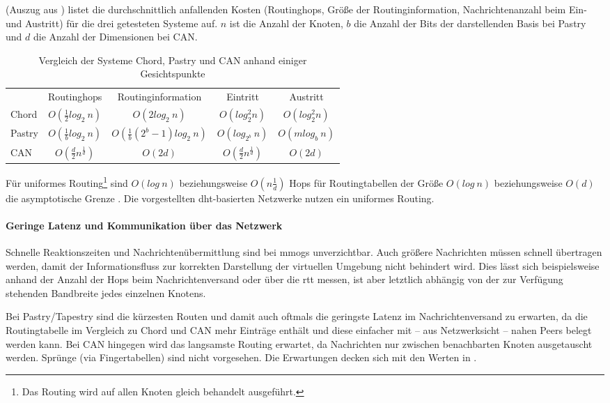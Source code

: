  (Auszug aus \cite{Goetz2005}) listet die durchschnittlich anfallenden Kosten (Routinghops, Größe der Routinginformation, Nachrichtenanzahl beim Ein- und Austritt) für die drei getesteten Systeme auf. $n$ ist die Anzahl der Knoten, $b$ die Anzahl der Bits der darstellenden Basis bei Pastry und $d$ die Anzahl der Dimensionen bei CAN.

\begin{table}[htbp]
\centering
\begin{tabular}{lcccc}
\toprule
 & Routinghops & Routinginformation & Eintritt & Austritt\\ 
 \cmidrule{2-5}
Chord & $O(\frac{1}{2}log_2~n)$ & $O(2log_2~n) $ & $ O(log_2^2 n) $ & $ O(log_2^2 n) $ \\
Pastry & $O(\frac{1}{b}log_2~n)$ & $O(\frac{1}{b} (2^b-1) log_2~n) $ & $ O(log_{2^b}~n) $ & $ O(mlog_b~n) $ \\
CAN & $O(\frac{d}{2}n^\frac{1}{d})	$ & $O(2 d) $ & $ O(\frac{d}{2}n^\frac{1}{d}) $ & $ O(2 d) $ \\
\bottomrule
\end{tabular}
\caption[Vergleich der Systeme Chord, Pastry und CAN]{Vergleich der Systeme Chord, Pastry und CAN anhand einiger Gesichtspunkte}
\label{tab:evaluation_fazit}
\end{table}

Für uniformes Routing\footnote{Das Routing wird auf allen Knoten gleich behandelt ausgeführt.} sind $O(log~n)$ beziehungsweise $O(n\frac{1}{d})$ Hops für Routingtabellen der Größe $O(log~n)$ beziehungsweise $O(d)$ die asymptotische Grenze \cite{Xu2004Fundamental}. Die vorgestellten \ac{dht}-basierten Netzwerke nutzen ein uniformes Routing.


\paragraph{Geringe Latenz und Kommunikation über das Netzwerk} Schnelle Reaktionszeiten und Nachrichtenübermittlung sind bei \acp{mmog} unverzichtbar. Auch größere Nachrichten müssen schnell übertragen werden, damit der Informationsfluss zur korrekten Darstellung der virtuellen Umgebung nicht behindert wird. Dies lässt sich beispielsweise anhand der Anzahl der Hops beim Nachrichtenversand oder über die \ac{rtt} messen, ist aber letztlich abhängig von der zur Verfügung stehenden Bandbreite jedes einzelnen Knotens.

Bei Pastry/Tapestry sind die kürzesten Routen und damit auch oftmals die geringste Latenz im Nachrichtenversand zu erwarten, da die Routingtabelle im Vergleich zu Chord und CAN mehr Einträge enthält und diese einfacher mit -- aus Netzwerksicht -- nahen Peers belegt werden kann. Bei CAN hingegen wird das langsamste Routing erwartet, da Nachrichten nur zwischen benachbarten Knoten ausgetauscht werden. Sprünge (via Fingertabellen) sind nicht vorgesehen. Die Erwartungen decken sich mit den Werten in .

